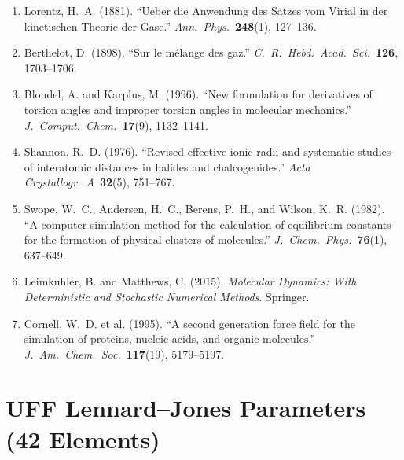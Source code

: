 \documentclass[11pt,twoside]{article}
\begin{document}
\begin{enumerate}
  \item Lorentz, H.~A. (1881). ``Ueber die Anwendung des Satzes vom Virial in der kinetischen Theorie der Gase.'' \textit{Ann.~Phys.}~\textbf{248}(1), 127--136.

  \item Berthelot, D. (1898). ``Sur le m\'{e}lange des gaz.'' \textit{C.~R.~Hebd.~Acad.~Sci.}~\textbf{126}, 1703--1706.

  \item Blondel, A. and Karplus, M. (1996). ``New formulation for derivatives of torsion angles and improper torsion angles in molecular mechanics.'' \textit{J.~Comput.~Chem.}~\textbf{17}(9), 1132--1141.

  \item Shannon, R.~D. (1976). ``Revised effective ionic radii and systematic studies of interatomic distances in halides and chalcogenides.'' \textit{Acta Crystallogr.~A}~\textbf{32}(5), 751--767.

  \item Swope, W.~C., Andersen, H.~C., Berens, P.~H., and Wilson, K.~R. (1982). ``A computer simulation method for the calculation of equilibrium constants for the formation of physical clusters of molecules.'' \textit{J.~Chem.~Phys.}~\textbf{76}(1), 637--649.

  \item Leimkuhler, B. and Matthews, C. (2015). \textit{Molecular Dynamics: With Deterministic and Stochastic Numerical Methods}. Springer.

  \item Cornell, W.~D. et al. (1995). ``A second generation force field for the simulation of proteins, nucleic acids, and organic molecules.'' \textit{J.~Am.~Chem.~Soc.}~\textbf{117}(19), 5179--5197.
\end{enumerate}


\appendix

\section{UFF Lennard--Jones Parameters (42 Elements)}
\label{app:uff}
\end{document}
